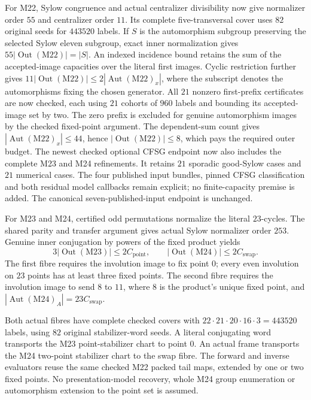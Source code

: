 For M22, Sylow congruence and actual centralizer divisibility now give
normalizer order $55$ and centralizer order $11$. Its complete
five-transversal cover uses $82$ original seeds for $443520$ labels.
If $S$ is the automorphism subgroup preserving the selected Sylow
eleven subgroup, exact inner normalization gives
$55|\operatorname{Out}(\mathrm{M22})|=|S|$.
An indexed incidence bound retains the sum of the accepted-image
capacities over the literal first images. Cyclic restriction further
gives $11|\operatorname{Out}(\mathrm{M22})|\leq2|\operatorname{Aut}(\mathrm{M22})_x|$,
where the subscript denotes the automorphisms fixing the chosen generator.
All $21$ nonzero first-prefix certificates are now checked, each using
$21$ cohorts of $960$ labels and bounding its accepted-image set by two.
The zero prefix is excluded for genuine automorphism images by the
checked fixed-point argument. The dependent-sum count gives
$|\operatorname{Aut}(\mathrm{M22})_x|\leq44$, hence
$|\operatorname{Out}(\mathrm{M22})|\leq8$, which pays the required
outer budget. The newest checked optional CFSG endpoint now also
includes the complete M23 and M24 refinements. It retains $21$ sporadic
good-Sylow cases and $21$ numerical cases. The four published input
bundles, pinned CFSG classification and both residual model callbacks
remain explicit; no finite-capacity premise is added. The canonical
seven-published-input endpoint is unchanged.

For M23 and M24, certified odd permutations normalize the literal
$23$-cycles. The shared parity and transfer argument gives actual
Sylow normalizer order $253$. Genuine inner conjugation by powers of
the fixed product yields
\[
 3|\operatorname{Out}(\mathrm{M23})|\leq2C_{\mathrm{point}},\qquad
 |\operatorname{Out}(\mathrm{M24})|\leq2C_{\mathrm{swap}}.
\]
The first fibre requires the involution image to fix point $0$; every
even involution on $23$ points has at least three fixed points. The
second fibre requires the involution image to send $8$ to $11$, where
$8$ is the product's unique fixed point, and
$|\operatorname{Aut}(\mathrm{M24})_A|=23C_{\mathrm{swap}}$.

Both actual fibres have complete checked covers with
$22\cdot21\cdot20\cdot16\cdot3=443520$ labels, using $82$ original
stabilizer-word seeds. A literal conjugating word transports the M23
point-stabilizer chart to point $0$. An actual frame transports the M24
two-point stabilizer chart to the swap fibre. The forward and inverse
evaluators reuse the same checked M22 packed tail maps, extended by one
or two fixed points. No presentation-model recovery, whole M24 group
enumeration or automorphism extension to the point set is assumed.

